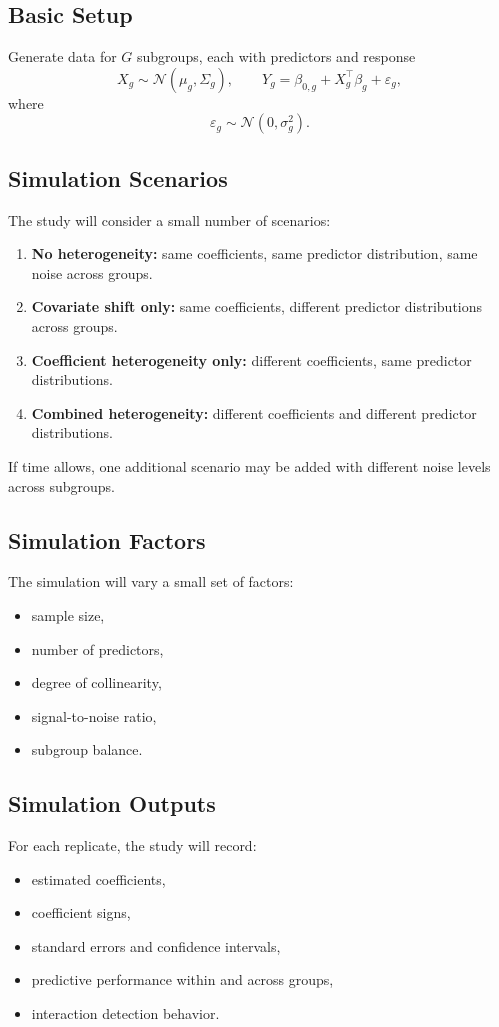 \documentclass[11pt]{article}
\begin{document}
\subsection{Basic Setup}
Generate data for $G$ subgroups, each with predictors and response
\[
X_g \sim \mathcal{N}(\mu_g, \Sigma_g), \qquad
Y_g = \beta_{0,g} + X_g^\top \beta_g + \varepsilon_g,
\]
where
\[
\varepsilon_g \sim \mathcal{N}(0, \sigma_g^2).
\]

\subsection{Simulation Scenarios}
The study will consider a small number of scenarios:

\begin{enumerate}[label=\textbf{S\arabic*.}]
    \item \textbf{No heterogeneity:} same coefficients, same predictor distribution, same noise across groups.
    \item \textbf{Covariate shift only:} same coefficients, different predictor distributions across groups.
    \item \textbf{Coefficient heterogeneity only:} different coefficients, same predictor distributions.
    \item \textbf{Combined heterogeneity:} different coefficients and different predictor distributions.
\end{enumerate}

If time allows, one additional scenario may be added with different noise levels across subgroups.

\subsection{Simulation Factors}
The simulation will vary a small set of factors:
\begin{itemize}
    \item sample size,
    \item number of predictors,
    \item degree of collinearity,
    \item signal-to-noise ratio,
    \item subgroup balance.
\end{itemize}

\subsection{Simulation Outputs}
For each replicate, the study will record:
\begin{itemize}
    \item estimated coefficients,
    \item coefficient signs,
    \item standard errors and confidence intervals,
    \item predictive performance within and across groups,
    \item interaction detection behavior.
\end{itemize}
\end{document}
